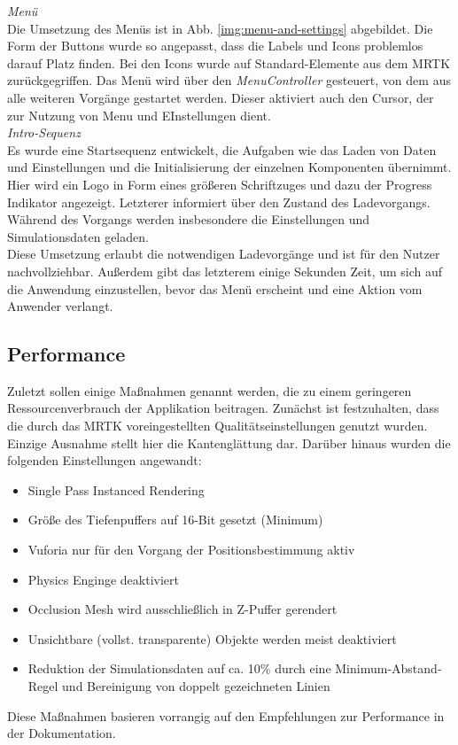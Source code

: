 \textit{Menü}\\
Die Umsetzung des Menüs ist in Abb. \ref{img:menu-and-settings} abgebildet. Die Form der Buttons wurde so angepasst, dass die Labels und Icons problemlos darauf Platz finden. Bei den Icons wurde auf Standard-Elemente aus dem MRTK zurückgegriffen. Das Menü wird über den \textit{MenuController} gesteuert, von dem aus alle weiteren Vorgänge gestartet werden. Dieser aktiviert auch den Cursor, der zur Nutzung von Menu und EInstellungen dient.\\

\textit{Intro-Sequenz}\\
Es wurde eine Startsequenz entwickelt, die Aufgaben wie das Laden von Daten und Einstellungen und die Initialisierung der einzelnen Komponenten übernimmt. Hier wird ein Logo in Form eines größeren Schriftzuges und dazu der Progress Indikator angezeigt. Letzterer informiert über den Zustand des Ladevorgangs. Während des Vorgangs werden insbesondere die Einstellungen und  Simulationsdaten geladen.\\

Diese Umsetzung erlaubt die notwendigen Ladevorgänge und ist für den Nutzer nachvollziehbar. Außerdem gibt das letzterem einige Sekunden Zeit, um sich auf die Anwendung einzustellen, bevor das Menü erscheint und eine Aktion vom Anwender verlangt.

\subsection{Performance}
Zuletzt sollen einige Maßnahmen genannt werden, die zu einem geringeren Ressourcenverbrauch der Applikation beitragen. Zunächst ist festzuhalten, dass die durch das MRTK voreingestellten Qualitätseinstellungen genutzt wurden. Einzige Ausnahme stellt hier die Kantenglättung dar. Darüber hinaus wurden die folgenden Einstellungen angewandt:

\begin{itemize}
	\setlength{\itemsep}{-1pt}
	\singlespacing
	\item Single Pass Instanced Rendering
	\item Größe des Tiefenpuffers auf 16-Bit gesetzt (Minimum)
	\item Vuforia nur für den Vorgang der Positionsbestimmung aktiv
	\item Physics Enginge deaktiviert
	\item Occlusion Mesh wird ausschließlich in Z-Puffer gerendert
	\item Unsichtbare (vollst. transparente) Objekte werden meist deaktiviert
	\item Reduktion der Simulationsdaten auf ca. 10\% durch eine Minimum-Abstand-Regel und Bereinigung von doppelt gezeichneten Linien
\end{itemize}

Diese Maßnahmen basieren vorrangig auf den Empfehlungen zur Performance in der Dokumentation.